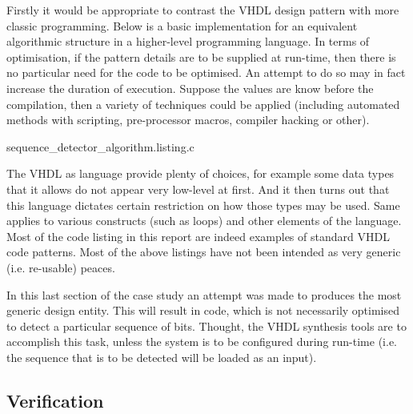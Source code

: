 \documentclass[10pt,a4paper]{report}
\begin{document}
 Firstly it would be appropriate to contrast the
 VHDL design pattern with more classic programming.
 Below is a basic implementation for an equivalent
 algorithmic structure in a higher-level programming
 language. In terms of optimisation, if the pattern
 details are to be supplied at run-time, then there
 is no particular need for the code to be optimised.
 An attempt to do so may in fact increase the duration
 of execution. Suppose the values are know before the
 compilation, then a variety of techniques could be
 applied (including automated methods with scripting,
 pre-processor macros, compiler hacking or other).



{sequence_detector_algorithm.listing.c}

 The VHDL as language provide plenty of choices,
 for example some data types that it allows do
 not appear very low-level at first. And it then
 turns out that this language dictates certain
 restriction on how those types may be used.
 Same applies to various constructs (such as loops)
 and other elements of the language. Most of the
 code listing in this report are indeed examples
 of standard VHDL code patterns. Most of the above
 listings have not been intended as very generic 
 (i.e. re-usable) peaces.

 In this last section of the case study an attempt
 was made to produces the most generic design entity.
 This will result in code, which is not necessarily
 optimised to detect a particular sequence of bits.
 Thought, the VHDL synthesis tools are to accomplish
 this task, unless the system is to be configured
 during run-time (i.e. the sequence that is to be
 detected will be loaded as an input).

\subsection{Verification}
\end{document}
